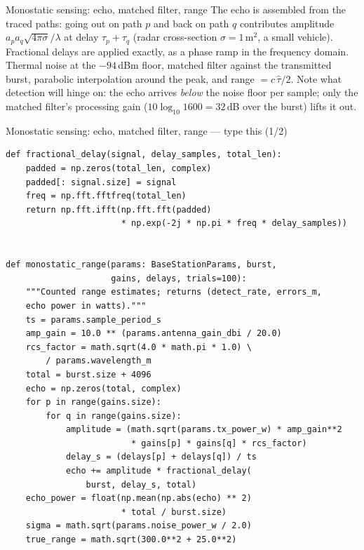 \documentclass[10pt]{beamer}
\begin{document}
\begin{frame}{Monostatic sensing: echo, matched filter, range}
  The echo is assembled from the traced paths: going out on
  path $p$ and back on path $q$ contributes amplitude
  $a_p a_q \sqrt{4\pi\sigma}/\lambda$ at delay
  $\tau_p + \tau_q$ (radar cross-section $\sigma = 1$\,m$^2$,
  a small vehicle). Fractional delays are applied exactly,
  as a phase ramp in the frequency domain. Thermal noise at
  the $-94$\,dBm floor, matched filter against the
  transmitted burst, parabolic interpolation around the
  peak, and range $= c\,\hat\tau/2$. Note what detection
  will hinge on: the echo arrives \emph{below} the noise
  floor per sample; only the matched filter's processing
  gain ($10\log_{10} 1600 = 32$\,dB over the burst) lifts
  it out.
\end{frame}

\begin{frame}[fragile]{Monostatic sensing: echo, matched filter, range --- type this (1/2)}
\begin{lstlisting}[basicstyle=\ttfamily\tiny]
def fractional_delay(signal, delay_samples, total_len):
    padded = np.zeros(total_len, complex)
    padded[: signal.size] = signal
    freq = np.fft.fftfreq(total_len)
    return np.fft.ifft(np.fft.fft(padded)
                       * np.exp(-2j * np.pi * freq * delay_samples))


def monostatic_range(params: BaseStationParams, burst,
                     gains, delays, trials=100):
    """Counted range estimates; returns (detect_rate, errors_m,
    echo power in watts)."""
    ts = params.sample_period_s
    amp_gain = 10.0 ** (params.antenna_gain_dbi / 20.0)
    rcs_factor = math.sqrt(4.0 * math.pi * 1.0) \
        / params.wavelength_m
    total = burst.size + 4096
    echo = np.zeros(total, complex)
    for p in range(gains.size):
        for q in range(gains.size):
            amplitude = (math.sqrt(params.tx_power_w) * amp_gain**2
                         * gains[p] * gains[q] * rcs_factor)
            delay_s = (delays[p] + delays[q]) / ts
            echo += amplitude * fractional_delay(
                burst, delay_s, total)
    echo_power = float(np.mean(np.abs(echo) ** 2)
                       * total / burst.size)
    sigma = math.sqrt(params.noise_power_w / 2.0)
    true_range = math.sqrt(300.0**2 + 25.0**2)
\end{lstlisting}
\end{frame}
\end{document}
